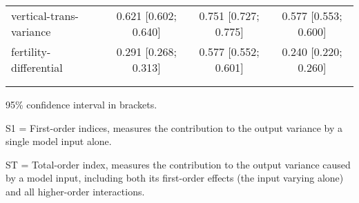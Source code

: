 \begin{table}[htp]
\begin{threeparttable}
\begin{tabular}{lccc}
	  \hspace{1.5em} vertical-trans-variance & 0.621 [0.602; 0.640]   & 0.751 [0.727; 0.775]   & 0.577 [0.553; 0.600] \\
	  \hspace{1.5em} fertility-differential & 0.291 [0.268; 0.313]   & 0.577 [0.552; 0.601]   & 0.240 [0.220; 0.260] \\
	 \\
\addlinespace
\hline
\end{tabular}
\begin{tablenotes}
\scriptsize
\item 95\% confidence interval in brackets.
\item S1 = First-order indices,  measures the contribution to the output variance by a single model input alone.
\item ST = Total-order index, measures the contribution to the output variance caused by a model input, including both its first-order effects (the input varying alone) and all higher-order interactions.
\end{tablenotes}
\end{threeparttable}
\end{table}